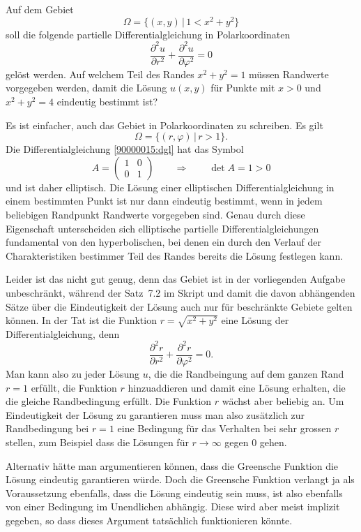 Auf dem Gebiet
\[
\Omega = \{ (x,y)\,|\, 1 < x^2 + y^2\}
\]
soll die folgende partielle Differentialgleichung in Polarkoordinaten
\begin{equation}
\frac{\partial^2 u}{\partial r^2}
+
\frac{\partial^2 u}{\partial \varphi^2}
=
0
\label{90000015:dgl}
\end{equation}
gelöst werden.
Auf welchem Teil des Randes $x^2 +y^2 = 1$ müssen Randwerte vorgegeben
werden, damit die Lösung $u(x,y)$ für Punkte mit $x>0$ und $x^2 + y^2 = 4$
eindeutig bestimmt ist?

\begin{loesung}
Es ist einfacher, auch das Gebiet in Polarkoordinaten zu schreiben.
Es gilt
\[
\Omega = \{ (r,\varphi)\,|\, r>1\}.
\]
Die Differentialgleichung \eqref{90000015:dgl} hat das Symbol
\[
A
=
\begin{pmatrix}
1&0\\
0&1
\end{pmatrix}
\qquad\Rightarrow\qquad
\det A=1>0
\]
und ist daher elliptisch.
Die Lösung einer elliptischen Differentialgleichung in einem bestimmten
Punkt ist nur dann eindeutig bestimmt, wenn in jedem beliebigen Randpunkt
Randwerte vorgegeben sind.
Genau durch diese Eigenschaft unterscheiden sich elliptische
partielle Differentialgleichungen fundamental von den
hyperbolischen, bei denen ein durch
den Verlauf der Charakteristiken bestimmer Teil des Randes bereits die
Lösung festlegen kann.

Leider ist das nicht gut genug, denn das Gebiet ist in der vorliegenden
Aufgabe unbeschränkt, während der Satz~7.2 im Skript und damit die davon
abhängenden Sätze über die Eindeutigkeit der Lösung auch nur für beschränkte
Gebiete gelten können.
In der Tat ist die Funktion  $r=\sqrt{x^2+y^2}$ eine Lösung der
Differentialgleichung, denn
\[
\frac{\partial^2 r}{\partial r^2} + \frac{\partial^2 r}{\partial \varphi^2}=0.
\]
Man kann also zu jeder Lösung $u$, die die Randbeingung auf dem ganzen Rand
$r=1$ erfüllt, die Funktion $r$ hinzuaddieren und damit eine Lösung erhalten,
die die gleiche Randbedingung erfüllt.
Die Funktion $r$ wächst aber beliebig an.
Um Eindeutigkeit der Lösung zu garantieren muss man also zusätzlich zur
Randbedingung bei $r=1$ eine Bedingung für das Verhalten bei sehr grossen $r$
stellen, zum Beispiel dass die Lösungen für $r\to\infty$ gegen $0$ gehen.

Alternativ hätte man argumentieren können, dass die Greensche Funktion 
die Lösung eindeutig garantieren würde.
Doch die Greensche Funktion verlangt ja als Voraussetzung ebenfalls,
dass die Lösung eindeutig sein muss, ist also ebenfalls von einer
Bedingung im Unendlichen abhängig.
Diese wird aber meist implizit gegeben, so dass dieses Argument
tatsächlich funktionieren könnte.


\end{loesung}
